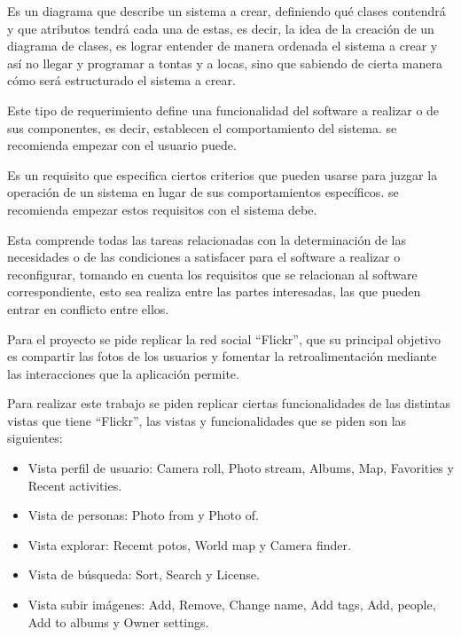 \documentclass{memoria}
\begin{document}
Es un diagrama que describe un sistema a crear, definiendo qué clases contendrá y que atributos tendrá cada una de estas, es decir, la idea de la creación de un diagrama de clases, es lograr entender de manera ordenada el sistema a crear y así no llegar y programar a tontas y a locas, sino que sabiendo de cierta manera cómo será estructurado el sistema a crear.\\


Este tipo de requerimiento define una funcionalidad del software a realizar o de sus componentes, es decir, establecen el comportamiento del sistema. se recomienda empezar con el usuario puede.\\


Es un requisito que especifica ciertos criterios que pueden usarse para juzgar la operación de un sistema en lugar de sus comportamientos específicos. se recomienda empezar estos requisitos con el sistema debe.\\


Esta comprende todas las tareas relacionadas con la determinación de las necesidades o de las condiciones a satisfacer para el software a realizar o reconfigurar, tomando en cuenta los requisitos que se relacionan al software correspondiente, esto sea realiza entre las partes interesadas, las que pueden entrar en conflicto entre ellos.




Para el proyecto se pide replicar la red social “Flickr”, que su principal objetivo es compartir las fotos de los usuarios y fomentar la retroalimentación mediante las interacciones que la aplicación permite.

Para realizar este trabajo se piden replicar ciertas funcionalidades de las distintas vistas que tiene “Flickr”, las vistas y funcionalidades que se piden son las siguientes:

\begin{itemize}
    \item Vista perfil de usuario: Camera roll, Photo stream, Albums, Map, Favorities y Recent activities.
    \item Vista de personas: Photo from y Photo of.
    \item Vista explorar: Recemt potos, World map y Camera finder.
    \item Vista de búsqueda: Sort, Search y License.
    \item Vista subir imágenes: Add, Remove, Change name, Add tags, Add, people, Add to albums y Owner settings.
\end{itemize}
\end{document}
